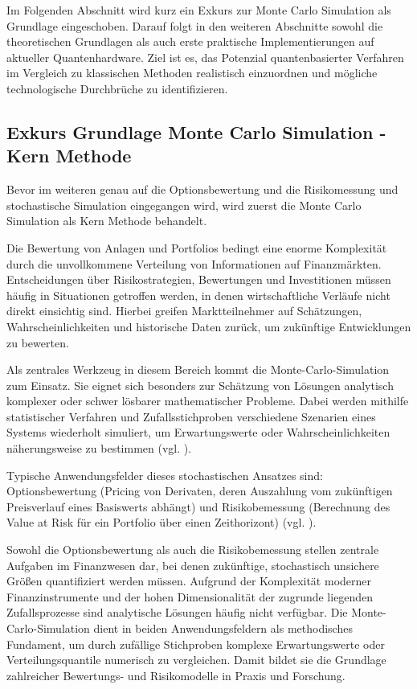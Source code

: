 Im Folgenden Abschnitt wird kurz ein Exkurs zur Monte Carlo Simulation als Grundlage eingeschoben. Darauf folgt in den weiteren Abschnitte sowohl die theoretischen Grundlagen als auch erste praktische Implementierungen auf aktueller Quantenhardware. Ziel ist es, das Potenzial quantenbasierter Verfahren im Vergleich zu klassischen Methoden realistisch einzuordnen und mögliche technologische Durchbrüche zu identifizieren.



\subsection{Exkurs Grundlage Monte Carlo Simulation - Kern Methode}
Bevor im weiteren genau auf die Optionsbewertung und die Risikomessung und stochastische Simulation eingegangen wird, wird zuerst die Monte Carlo Simulation als Kern Methode behandelt.

Die Bewertung von Anlagen und Portfolios bedingt eine enorme Komplexität durch die unvollkommene Verteilung von Informationen auf Finanzmärkten. Entscheidungen über Risikostrategien, Bewertungen und Investitionen müssen häufig in Situationen getroffen werden, in denen wirtschaftliche Verläufe nicht direkt einsichtig sind. Hierbei greifen Marktteilnehmer auf Schätzungen, Wahrscheinlichkeiten und historische Daten zurück, um zukünftige Entwicklungen zu bewerten. 

 Als zentrales Werkzeug in diesem Bereich kommt die Monte-Carlo-Simulation zum Einsatz. Sie eignet sich besonders zur Schätzung von Lösungen analytisch komplexer oder schwer lösbarer mathematischer Probleme. Dabei werden mithilfe statistischer Verfahren und Zufallsstichproben verschiedene Szenarien eines Systems wiederholt simuliert, um Erwartungswerte oder Wahrscheinlichkeiten näherungsweise zu bestimmen (vgl. \cite{orus_quantum_2019}).

Typische Anwendungsfelder dieses stochastischen Ansatzes sind: Optionsbewertung (Pricing von Derivaten, deren Auszahlung vom zukünftigen Preisverlauf eines Basiswerts abhängt) und Risikobemessung (Berechnung des Value at Risk für ein Portfolio über einen Zeithorizont) (vgl. \cite{orus_quantum_2019}). 

Sowohl die Optionsbewertung als auch die Risikobemessung stellen zentrale Aufgaben im Finanzwesen dar, bei denen zukünftige, stochastisch unsichere Größen quantifiziert werden müssen. Aufgrund der Komplexität moderner Finanzinstrumente und der hohen Dimensionalität der zugrunde liegenden Zufallsprozesse sind analytische Lösungen häufig nicht verfügbar. Die Monte-Carlo-Simulation dient in beiden Anwendungsfeldern als methodisches Fundament, um durch zufällige Stichproben komplexe Erwartungswerte oder Verteilungsquantile numerisch zu vergleichen. Damit bildet sie die Grundlage zahlreicher Bewertungs- und Risikomodelle in Praxis und Forschung.

